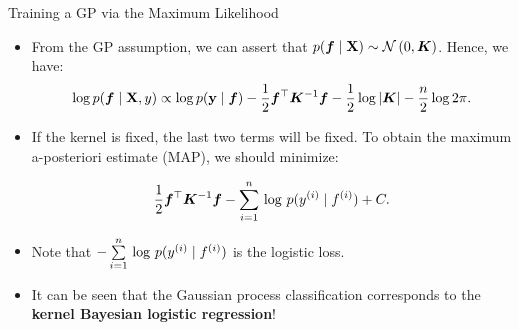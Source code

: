 \begin{frame}[c,allowframebreaks]{Training a GP via the Maximum Likelihood}
\begin{itemize}
\vspace{-0.5cm}
\begin{eqnarray*}p(\bm{f}\mid\Xmat, \ydat) &=&  \frac{p(\ydat\mid\bm{f}, \Xmat) \cdot p(\bm{f}\mid\Xmat)}{p(\ydat\mid\Xmat)} \propto p(\ydat\mid\bm{f}) \cdot p(\bm{f}\mid\Xmat),\end{eqnarray*}
\vspace{-2mm}
where, the denominator is independent of $\bm{f}$ and hence has been dropped.

\vspace{15mm}

\item From the GP assumption, we can assert that $p(\bm{f}\mid\mathbf{X}) \sim \mathcal{N}\left(0, \bm{K}\right)$. Hence, we have:
\vspace{-2mm}
$$\log p(\bm{f}\mid\mathbf{X}, y) \propto \log p(\mathbf{y}\mid\bm{f}) - \frac{1}{2} \bm{f}^\top \bm{K}^{-1} \bm{f} - \frac{1}{2} \log |\bm{K}| - \frac{n}{2} \log 2 \pi.$$

\end{itemize}


\framebreak

\begin{itemize}

\item If the kernel is fixed, the last two terms will be fixed. To obtain the maximum a-posteriori estimate (MAP), we should minimize:

$$\frac{1}{2} \bm{f}^\top \bm{K}^{-1}\bm{f} - \sum\limits_{i=1}^n\, \log\, p(y^{(i)}\mid f^{(i)}) + C.$$

\vspace{0.5cm}
\item Note that $-\sum\limits_{i=1}^n\,\log \,p(y^{(i)}\mid f^{(i)})$ is the logistic loss.

\vspace{0.7cm}
\item It can be seen that the Gaussian process classification corresponds to the \textbf{kernel Bayesian logistic regression}!
\end{itemize}

\end{frame}




